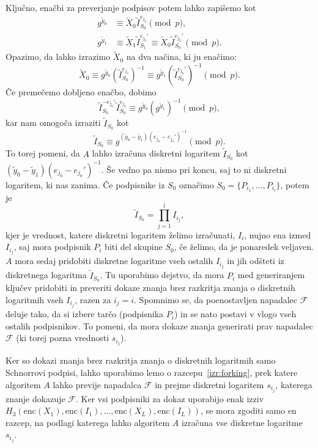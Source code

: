 \begin{dokaz}
Ključno, enačbi za preverjanje podpisov potem lahko zapišemo kot
\begin{align*}
    g^{\tilde{y}_0} &\equiv \tilde{X}_0 \tilde{I}_{S_0}^{e_{j_0}} \pmod p, \\
    g^{\tilde{y}_1} &\equiv \tilde{X}_1 \tilde{I}_{S_1}^{e_{j_0}'}
        \equiv \tilde{X}_0 \tilde{I}_{S_0}^{e_{j_0}'} \pmod p.
\end{align*}
Opazimo, da lahko izrazimo $\tilde{X}_0$ na dva načina, ki ju enačimo:
$$
\tilde{X}_0 \equiv g^{\tilde{y}_0}(\tilde{I}_{S_0}^{e_{j_0}})^{-1}
    \equiv g^{\tilde{y}_1}(\tilde{I}_{S_0}^{e_{j_0}'})^{-1} \pmod p.
$$
Če premečemo dobljeno enačbo, dobimo
$$
\tilde{I}_{S_0}^{- e_{j_0}'} \tilde{I}_{S_0}^{e_{j_0}} \equiv g^{\tilde{y}_0}(g^{\tilde{y}_1})^{-1} \pmod p,
$$
kar nam omogoča izraziti $\tilde{I}_{S_0}$ kot
$$
\tilde{I}_{S_0} \equiv g^{(\tilde{y}_0 - \tilde{y}_1) (e_{j_0} - e_{j_0}')^{-1}} \pmod p.
$$
To torej pomeni, da $A$ lahko izračuna diskretni logaritem $\tilde{I}_{S_0}$ kot 
$(\tilde{y}_0 - \tilde{y}_1) (e_{j_0} - e_{j_0}')^{-1}$. Še vedno pa nismo pri koncu, saj to ni
diskretni logaritem, ki nas zanima. Če podpisnike iz $S_0$ označimo $S_0 = \{P_{i_1}, \dots, P_{i_l}\}$,
potem je 
$$
\tilde{I}_{S_0} = \prod_{j=1}^l I_{i_j},
$$
kjer je vrednost, katere diskretni logaritem želimo izračunati, $I_i$, nujno ena izmed $I_{i_j}$,
saj mora podpisnik $P_i$ biti del skupine $S_0$, če želimo, da je ponaredek veljaven. $A$ mora sedaj
pridobiti diskretne logaritme vseh ostalih $I_{i_j}$ in jih odšteti iz diskretnega logaritma
$\tilde{I}_{S_0}$. Tu uporabimo dejstvo, da mora $P_i$ med generiranjem ključev pridobiti in preveriti
dokaze znanja brez razkritja znanja o diskretnih logaritmih vseh $I_{i_j}$, razen za $i_j = i$.
Spomnimo se, da poenostavljen napadalec $\mathcal{F}$ deluje tako, da si izbere tarčo (podpisnika $P_i$)
in se nato postavi v vlogo vseh ostalih podpisnikov. To pomeni, da mora dokaze znanja generirati
prav napadalec $\mathcal{F}$ (ki torej pozna vrednosti $s_{i_j}$).

Ker so dokazi znanja brez razkritja znanja o diskretnih logaritmih samo Schnorrovi podpisi, lahko
uporabimo lemo o razcepu~\ref{izr:forking}, prek katere algoritem $A$ lahko previje napadalca
$\mathcal{F}$ in prejme diskretni logaritem $s_{i_j}$, katerega znanje dokazuje $\mathcal{F}$.
Ker vsi podpisniki za dokaz uporabijo enak izziv $H_3(\text{enc}(X_1), \text{enc}(I_1), \dots,
\text{enc}(X_L), \text{enc}(I_L))$, se mora zgoditi samo en razcep, na podlagi katerega lahko
algoritem $A$ izračuna vse diskretne logaritme $s_{i_j}$.


\end{dokaz}
